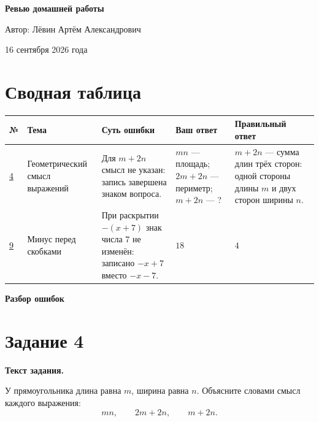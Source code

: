 \documentclass[12pt,a4paper]{article}
\begin{document}
\begin{titlepage}
\centering
\vspace*{0.18\textheight}
{\LARGE\bfseries Ревью домашней работы\par}
\vspace{18mm}
{\large Автор: Лёвин Артём Александрович\par}
\vspace{6mm}
{\large 16 сентября 2026 года\par}
\vfill
{}
\end{titlepage}

\newpage
\section*{Сводная таблица}
\small
\begin{longtable}{|p{0.8cm}|p{2.8cm}|p{4.6cm}|p{2.6cm}|p{2.6cm}|}
\hline
\textbf{№} & \textbf{Тема} & \textbf{Суть ошибки} & \textbf{Ваш ответ} & \textbf{Правильный ответ} \\
\hline
\hyperref[task:4]{4} &
Геометрический смысл выражений &
Для $m+2n$ смысл не указан: запись завершена знаком вопроса. &
$mn$ --- площадь; $2m+2n$ --- периметр; $m+2n$ --- ? &
$m+2n$ --- сумма длин трёх сторон: одной стороны длины $m$ и двух сторон ширины $n$. \\
\hline
\hyperref[task:9]{9} &
Минус перед скобками &
При раскрытии $-(x+7)$ знак числа $7$ не изменён: записано $-x+7$ вместо $-x-7$. &
$18$ &
$4$ \\
\hline
\end{longtable}
\normalsize

\newpage
\thispagestyle{empty}
\vspace*{\fill}
\begin{center}
{\LARGE\bfseries Разбор ошибок}
\end{center}
\vspace*{\fill}

\newpage
{}\label{task:4}
\section*{Задание 4}

\textbf{Текст задания.}

У прямоугольника длина равна $m$, ширина равна $n$. Объясните словами смысл каждого выражения:
\[
mn,\qquad 2m+2n,\qquad m+2n.
\]
\end{document}
